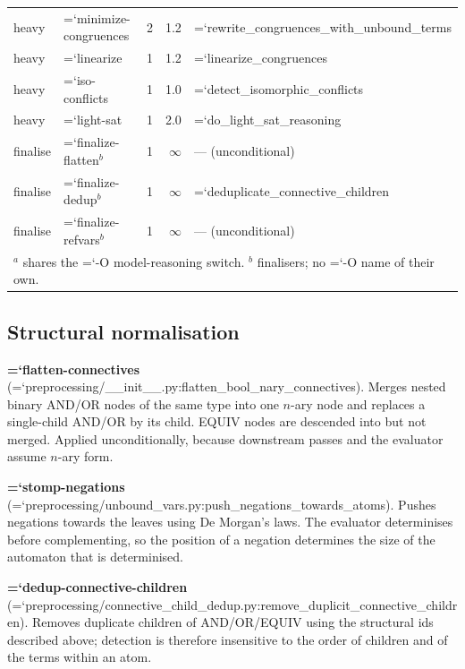 \documentclass[10pt,a4paper]{article}
\newcommand{\code}[1]{{\small\ttfamily\hyphenchar\font=`\-\relax #1}}
\begin{document}
\begin{table}[t]
\begin{tabular}{llrrl}
heavy & \code{minimize-congruences} & 2 & 1.2 & \code{rewrite\_\allowbreak congruences\_\allowbreak with\_\allowbreak unbound\_\allowbreak terms} \\
heavy & \code{linearize}            & 1 & 1.2 & \code{linearize\_congruences} \\
heavy & \code{iso-conflicts}        & 1 & 1.0 & \code{detect\_isomorphic\_conflicts} \\
heavy & \code{light-sat}            & 1 & 2.0 & \code{do\_light\_sat\_reasoning} \\
\midrule
finalise & \code{finalize-flatten}$^b$ & 1 & $\infty$ & --- (unconditional) \\
finalise & \code{finalize-dedup}$^b$   & 1 & $\infty$ & \code{deduplicate\_connective\_children} \\
finalise & \code{finalize-refvars}$^b$ & 1 & $\infty$ & --- (unconditional) \\
\bottomrule
\multicolumn{5}{l}{\footnotesize $^a$ shares the \code{-O model-reasoning} switch.
  $^b$ finalisers; no \code{-O} name of their own.} \\
\end{tabular}
\end{table}

\subsection{Structural normalisation}

\textbf{\code{flatten-connectives}} (\code{preprocessing/\_\allowbreak \_\allowbreak init\_\allowbreak \_\allowbreak .py:\allowbreak flatten\_\allowbreak bool\_\allowbreak nary\_\allowbreak connectives}).
Merges nested binary AND/OR nodes of the same type into one $n$-ary node and replaces a single-child
AND/OR by its child.  EQUIV nodes are descended into but not merged.  Applied unconditionally, because
downstream passes and the evaluator assume $n$-ary form.

\textbf{\code{stomp-negations}} (\code{preprocessing/unbound\_\allowbreak vars.py:\allowbreak push\_\allowbreak negations\_\allowbreak towards\_\allowbreak atoms}).
Pushes negations towards the leaves using De Morgan's laws.  The evaluator determinises before
complementing, so the position of a negation determines the size of the automaton that is
determinised.

\textbf{\code{dedup-connective-children}}
(\code{preprocessing/connective\_\allowbreak child\_\allowbreak dedup.py:\allowbreak remove\_\allowbreak duplicit\_\allowbreak connective\_\allowbreak children}).
Removes duplicate children of AND/OR/EQUIV using the structural ids described above; detection is
therefore insensitive to the order of children and of the terms within an atom.
\end{document}
